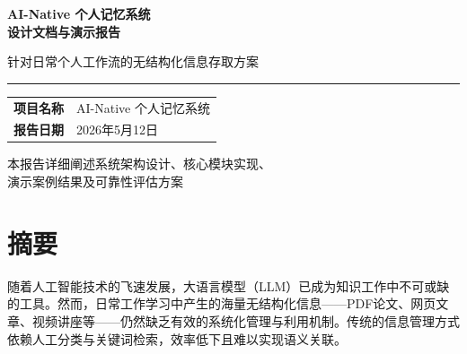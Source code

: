 \documentclass[12pt,a4paper,oneside]{article}
\begin{document}
\tableofcontents
\newpage

\begin{titlepage}
    \centering
    \vspace*{2cm}

    {\Huge\bfseries\color{darkblue}
    AI-Native 个人记忆系统\\[0.5cm]
    设计文档与演示报告\par}
    \vspace{1.5cm}

    {\Large\color{gray}
    针对日常个人工作流的无结构化信息存取方案\par}
    \vspace{2cm}

    \begin{center}
        \rule{0.6\textwidth}{2pt}
    \end{center}
    \vspace{1.5cm}

    \begin{table}[h]
        \centering
        \begin{tabular}{ll}
            \textbf{项目名称} & AI-Native 个人记忆系统 \\
            \textbf{报告日期} & 2026年5月12日 \\
        \end{tabular}
    \end{table}
    \vspace{2cm}

    \vfill
    {\small\color{gray}
    本报告详细阐述系统架构设计、核心模块实现、\\%
    演示案例结果及可靠性评估方案\par}

    \newpage
\end{titlepage}

\section*{摘要}

随着人工智能技术的飞速发展，大语言模型（LLM）已成为知识工作中不可或缺的工具。然而，日常工作学习中产生的海量无结构化信息——PDF论文、网页文章、视频讲座等——仍然缺乏有效的系统化管理与利用机制。传统的信息管理方式依赖人工分类与关键词检索，效率低下且难以实现语义关联。
\end{document}
